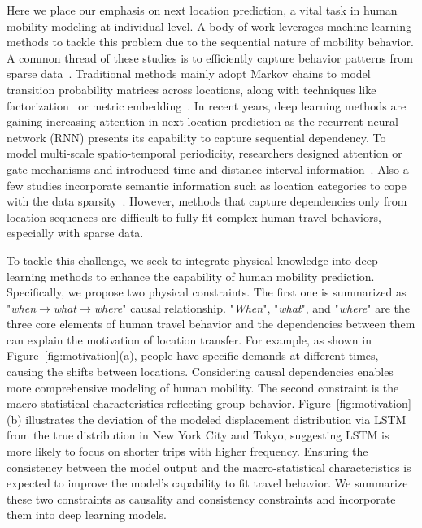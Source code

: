\documentclass[sigconf]{acmart}
\begin{document}
    Here we place our emphasis on next location prediction, a vital task in human mobility modeling at individual level. A body of work leverages machine learning methods to tackle this problem due to the sequential nature of mobility behavior. A common thread of these studies is to efficiently capture behavior patterns from sparse data~\cite{luca2020deep,lian2020geography,guo2020attentional,luo2021stan}. Traditional methods mainly adopt Markov chains to model transition probability matrices across locations, along with techniques like factorization~\cite{rendle2010factorizing,cheng2013you, he2016inferring} or metric embedding~\cite{feng2015personalized}. 
    In recent years, deep learning methods are gaining increasing attention in next location prediction as the recurrent neural network (RNN) presents its capability to capture sequential dependency. 
    To model multi-scale spatio-temporal periodicity, researchers designed attention or gate mechanisms and introduced time and distance interval information~\cite{feng2018deepmove,manotumruksa2018contextual,zhao2019go,sun2020go,yang2020location}.
    Also a few studies incorporate semantic information such as location categories to cope with the data sparsity~\cite{he2017category,yu2020category,guo2020attentional}. 
    However, methods that capture dependencies only from location sequences are difficult to fully fit complex human travel behaviors, especially with sparse data.

    To tackle this challenge, we seek to integrate physical knowledge into deep learning methods to enhance the capability of human mobility prediction. Specifically, we propose two physical constraints.
    The first one is summarized as "\textit{when$\rightarrow$what$\rightarrow$where}" causal relationship. 
    "\textit{When}", "\textit{what}", and "\textit{where}" are the three core elements of human travel behavior and the dependencies between them can explain the motivation of location transfer. For example, as shown in Figure~\ref{fig:motivation}(a), people have specific demands at different times, causing the shifts between locations. 
    Considering causal dependencies enables more comprehensive modeling of human mobility. 
    The second constraint is the macro-statistical characteristics reflecting group behavior. Figure~\ref{fig:motivation}(b) illustrates the deviation of the modeled displacement distribution via LSTM from the true distribution in New York City and Tokyo, suggesting LSTM is more likely to focus on shorter trips with higher frequency. 
    Ensuring the consistency between the model output and the macro-statistical characteristics is expected to improve the model's capability to fit travel behavior.
    We summarize these two constraints as causality and consistency constraints and incorporate them into deep learning models.
    
\end{document}
